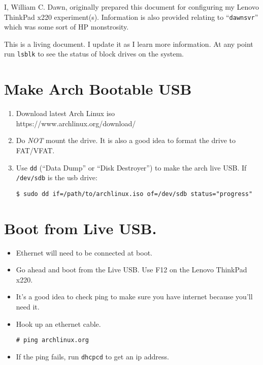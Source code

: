 \documentclass{article}
\begin{document}
I, William C. Dawn, originally prepared this document for configuring my Lenovo
ThinkPad x220 experiment(s). Information is also provided relating to
``\verb|dawnsvr|'' which was some sort of HP monstrosity.

This is a living document. I update it as I learn more information. At any point
run \verb|lsblk| to see the status of block drives on the system.

\section{Make Arch Bootable USB}
  \begin{enumerate}
    \item Download latest Arch Linux iso\\
      https://www.archlinux.org/download/
    \item Do \emph{NOT} mount the drive. It is also a good idea to format the
      drive to FAT/VFAT.
    \item Use \verb|dd| (``Data Dump'' or ``Disk Destroyer'') to make the arch 
      live USB. If \verb|/dev/sdb| is the usb drive:
\begin{verbatim}
$ sudo dd if=/path/to/archlinux.iso of=/dev/sdb status="progress"
\end{verbatim}
  \end{enumerate}

\section{Boot from Live USB.}
  \begin{itemize}
    \item Ethernet will need to be connected at boot.
    \item Go ahead and boot from the Live USB. Use F12 on the Lenovo ThinkPad
      x220.
    \item It's a good idea to check ping to make sure you have internet because
      you'll need it.
    \item Hook up an ethernet cable.
\begin{verbatim}
# ping archlinux.org
\end{verbatim}
    \item If the ping fails, run \verb|dhcpcd| to get an ip address.
  \end{itemize}
\end{document}
